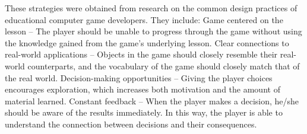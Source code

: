These strategies were obtained from research on the common design practices of educational computer game developers.  They include:
Game centered on the lesson -- The player should be unable to progress through the game without using the knowledge gained from the game's underlying lesson.
Clear connections to real-world applications -- Objects in the game should closely resemble their real-world counterparts, and the vocabulary of the game should closely match that of the real world.
Decision-making opportunities -- Giving the player choices encourages exploration, which increases both motivation and the amount of material learned.
Constant feedback -- When the player makes a decision, he/she should be aware of the results immediately.  In this way, the player is able to understand the connection between decisions and their consequences.